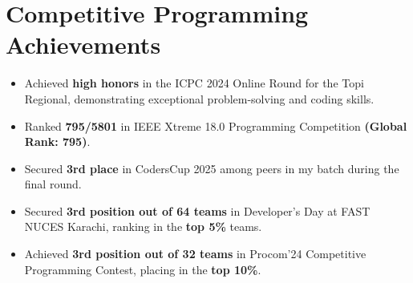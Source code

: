 \documentclass[letterpaper,11pt]{article}
\makeatletter
\newcommand{\resumeItem}[1]{
  \item\small{
    {#1 \vspace{-2pt}}
  }
}
\newcommand{\resumeProjectHeading}[2]{
    \item
    \begin{tabular*}{1.001\textwidth}{l@{\extracolsep{\fill}}r}
      \small#1 & \textbf{\small #2}\\
    \end{tabular*}\vspace{-7pt}
}
\newcommand{\resumeSubHeadingListStart}{\begin{itemize}[leftmargin=0.0in, label={}]}
\newcommand{\resumeSubHeadingListEnd}{\end{itemize}}
\newcommand{\resumeItemListStart}{\begin{itemize}}
\newcommand{\resumeItemListEnd}{\end{itemize}\vspace{-5pt}}
\makeatother
\begin{document}
          











\section{Competitive Programming Achievements}
\vspace{-5pt}
\resumeSubHeadingListStart
  \resumeItemListStart

    \vspace{4pt}
    \resumeItem{Achieved \textbf{high honors} in the ICPC 2024 Online Round for the Topi Regional, demonstrating exceptional problem-solving and coding skills.}

    \vspace{4pt}
    \resumeItem{Ranked \textbf{795/5801} in IEEE Xtreme 18.0 Programming Competition \textbf{(Global Rank: 795)}.}

    \vspace{4pt}
    \resumeItem{Secured \textbf{3rd place} in CodersCup 2025 among peers in my batch during the final round.}

    \vspace{4pt}
    \resumeItem{Secured \textbf{3rd position out of 64 teams} in Developer's Day at FAST NUCES Karachi, ranking in the \textbf{top 5\%} teams.}

    \vspace{4pt}
    \resumeItem{Achieved \textbf{3rd position out of 32 teams} in Procom'24 Competitive Programming Contest, placing in the \textbf{top 10\%}.}

  \resumeItemListEnd
\resumeSubHeadingListEnd
\vspace{-15pt}
\end{document}
